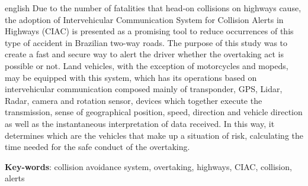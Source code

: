 \begin{resumo}[Abstract]
 \begin{otherlanguage*}{english}
   Due to the number of fatalities that head-on collisions on highways cause, the adoption of Intervehicular Communication System for Collision Alerts in Highways (CIAC) is presented as a promising tool to reduce occurrences of this type of accident in Brazilian two-way roads. The purpose of this study was to create a fast and secure way to alert the driver whether the overtaking act is possible or not. Land vehicles,  with the exception of motorcycles and mopeds, may be equipped with this system, which has its operations based on intervehicular communication composed mainly of transponder, GPS, Lidar, Radar, camera and rotation sensor, devices which together execute the transmission, sense of geographical position, speed, direction and vehicle direction as well as the instantaneous interpretation of data received. In this way, it determines which are the vehicles that make up a situation of risk, calculating the time needed for the safe conduct of the overtaking.


   \vspace{\onelineskip}

   \noindent
   \textbf{Key-words}: collision avoidance system, overtaking, highways, CIAC, collision, alerts
 \end{otherlanguage*}
\end{resumo}
